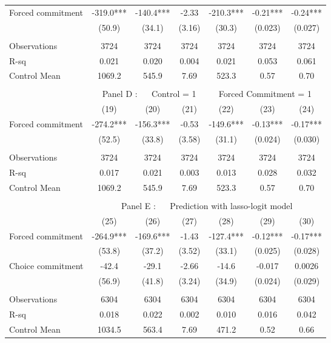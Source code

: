 \begin{tabular}{lcccccc}
\midrule
\midrule
Forced commitment  & -319.0*** & -140.4*** & -2.33 & -210.3*** & -0.21*** & -0.24*** \\
      & (50.9) & (34.1) & (3.16) & (30.3) & (0.023) & (0.027) \\
      &       &       &       &       &       &  \\
\midrule
Observations & 3724  & 3724  & 3724  & 3724  & 3724  & 3724 \\
R-sq  & 0.021 & 0.020 & 0.004 & 0.021 & 0.053 & 0.061 \\
Control Mean & 1069.2 & 545.9 & 7.69  & 523.3 & 0.57  & 0.70 \\
\midrule
\midrule
      &       &       &       &       &       &  \\
\midrule
      & \multicolumn{6}{c}{Panel D : $\quad$ Control  = 1       $\quad\quad$                      Forced Commitment = 1} \\
\midrule
\midrule
      & (19)  & (20)  & (21)  & (22)  & (23)  & (24) \\
\midrule
\midrule
Forced commitment  & -274.2*** & -156.3*** & -0.53 & -149.6*** & -0.13*** & -0.17*** \\
      & (52.5) & (33.8) & (3.58) & (31.1) & (0.024) & (0.030) \\
      &       &       &       &       &       &  \\
\midrule
Observations & 3724  & 3724  & 3724  & 3724  & 3724  & 3724 \\
R-sq  & 0.017 & 0.021 & 0.003 & 0.013 & 0.028 & 0.032 \\
Control Mean & 1069.2 & 545.9 & 7.69  & 523.3 & 0.57  & 0.70 \\
\midrule
\midrule
      &       &       &       &       &       &  \\
\midrule
      & \multicolumn{6}{c}{Panel E : $\quad$ Prediction with lasso-logit model} \\
\midrule
\midrule
      & (25)  & (26)  & (27)  & (28)  & (29)  & (30) \\
\midrule
\midrule
Forced commitment  & -264.9*** & -169.6*** & -1.43 & -127.4*** & -0.12*** & -0.17*** \\
      & (53.8) & (37.2) & (3.52) & (33.1) & (0.025) & (0.028) \\
Choice commitment & -42.4 & -29.1 & -2.66 & -14.6 & -0.017 & 0.0026 \\
      & (56.9) & (41.8) & (3.24) & (34.9) & (0.024) & (0.029) \\
      &       &       &       &       &       &  \\
\midrule
Observations & 6304  & 6304  & 6304  & 6304  & 6304  & 6304 \\
R-sq  & 0.018 & 0.022 & 0.002 & 0.010 & 0.016 & 0.042 \\
Control Mean & 1034.5 & 563.4 & 7.69  & 471.2 & 0.52  & 0.66 \\
\bottomrule
\bottomrule
\end{tabular}%
